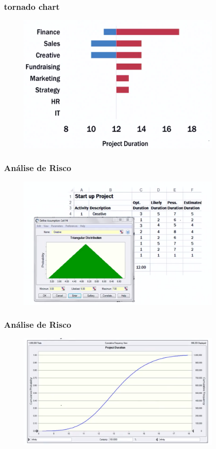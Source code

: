 \begin{frame}
 \frametitle{tornado chart}
  \begin{figure}
   \centering
   \includegraphics[width = 0.9\textwidth]{figs/fig11.png}
  \end{figure}
\end{frame}

\begin{frame}
 \frametitle{Análise de Risco}
  \begin{figure}
   \centering
   \includegraphics[width = 0.9\textwidth]{figs/fig12.png}
  \end{figure}
\end{frame}

\begin{frame}
 \frametitle{Análise de Risco}
  \begin{figure}
   \centering
   \includegraphics[width = 0.9\textwidth]{figs/fig13.png}
  \end{figure}
\end{frame}

